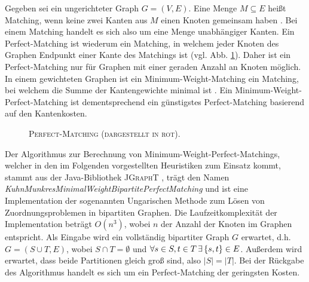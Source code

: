 Gegeben sei ein ungerichteter Graph $G = (V, E)$. Eine Menge $M \subseteq E$ heißt Matching,
wenn keine zwei Kanten aus $M$ einen Knoten gemeinsam haben \cite{Gibbons1985}. Bei einem Matching handelt es sich also
um eine Menge unabhängiger Kanten. Ein Perfect-Matching ist wiederum ein Matching, in welchem jeder Knoten des Graphen
Endpunkt einer Kante des Matchings ist \cite{Gibbons1985} (vgl. Abb. \ref{fig:perfect_matching}).
Daher ist ein Perfect-Matching nur für Graphen mit einer geraden Anzahl an Knoten möglich.
In einem gewichteten Graphen ist ein Minimum-Weight-Matching ein Matching, bei welchem die Summe der Kantengewichte
minimal ist \cite{Gibbons1985}. Ein Minimum-Weight-Perfect-Matching ist dementsprechend ein günstigstes Perfect-Matching
basierend auf den Kantenkosten.

\begin{figure}[H]
\centering
{}
\caption{\textsc{Perfect-Matching (dargestellt in rot).}}
\label{fig:perfect_matching}
\end{figure}

Der Algorithmus zur Berechnung von Minimum-Weight-Perfect-Matchings, welcher in den im Folgenden
vorgestellten Heuristiken zum Einsatz kommt, stammt aus der Java-Bibliothek \textsc{JGraphT} \cite{JGraphT}, trägt
den Namen \textit{KuhnMunkresMinimalWeightBipartitePerfectMatching} und ist eine Implementation der
sogenannten Ungarischen Methode zum Lösen von Zuordnungsproblemen in bipartiten Graphen.
Die Laufzeitkomplexität der Implementation beträgt $O(n^3)$, wobei $n$ der Anzahl der Knoten im Graphen entspricht.
Als Eingabe wird ein vollständig bipartiter Graph $G$ erwartet, d.h. $G= (S \cup T, E)$, wobei $S \cap T = \emptyset$ und
$\forall s \in S, t \in T \thinspace \exists \thinspace \{s, t\} \in E$. Außerdem wird erwartet, dass beide Partitionen gleich groß sind,
also $|S| = |T|$. Bei der Rückgabe des Algorithmus handelt es sich um ein Perfect-Matching der geringsten Kosten.\newline


